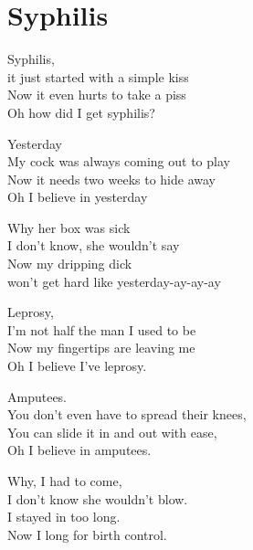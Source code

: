 \section{Syphilis}
Syphilis,\\
it just started with a simple kiss\\
Now it even hurts to take a piss\\
Oh how did I get syphilis?

Yesterday\\
My cock was always coming out to play\\
Now it needs two weeks to hide away\\
Oh I believe in yesterday

Why her box was sick\\
I don't know, she wouldn't say\\
Now my dripping dick\\
won't get hard like yesterday-ay-ay-ay

Leprosy,\\
I'm not half the man I used to be\\
Now my fingertips are leaving me\\
Oh I believe I've leprosy.

Amputees.\\
You don't even have to spread their knees,\\
You can slide it in and out with ease,\\
Oh I believe in amputees.

Why, I had to come,\\
I don't know she wouldn't blow.\\
I stayed in too long.\\
Now I long for birth control.